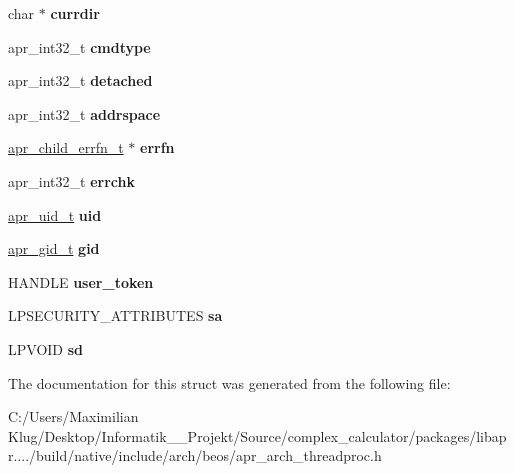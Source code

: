 \begin{DoxyCompactItemize}
\item 
\mbox{\label{structapr__procattr__t_af18bc3b976481e21b7f28aa80b51d5c6}} 
char $\ast$ {\bfseries currdir}
\item 
\mbox{\label{structapr__procattr__t_a5eccc57bc4f7b431e908fe5d122a747a}} 
apr\+\_\+int32\+\_\+t {\bfseries cmdtype}
\item 
\mbox{\label{structapr__procattr__t_a0d6c34b77e0530d9fe46d3af7c8e8fc9}} 
apr\+\_\+int32\+\_\+t {\bfseries detached}
\item 
\mbox{\label{structapr__procattr__t_a7ed0386d21108c46e0c99a72cfed17ce}} 
apr\+\_\+int32\+\_\+t {\bfseries addrspace}
\item 
\mbox{\label{structapr__procattr__t_a493816f4a4eac5b7d2453c1b99176706}} 
\mbox{\hyperlink{group__apr__thread__proc_ga1feae4cf7ed6f156a0db10172e228e2d}{apr\+\_\+child\+\_\+errfn\+\_\+t}} $\ast$ {\bfseries errfn}
\item 
\mbox{\label{structapr__procattr__t_a16163057dbd92ddf9f91bf7fc8999c18}} 
apr\+\_\+int32\+\_\+t {\bfseries errchk}
\item 
\mbox{\label{structapr__procattr__t_aab58995d64f21273fd92b102a38ca05f}} 
\mbox{\hyperlink{group__apr__user_gad1aa508f584bc230acf4f68ba4fc4de7}{apr\+\_\+uid\+\_\+t}} {\bfseries uid}
\item 
\mbox{\label{structapr__procattr__t_a6c1fc0bb1a36b76b819f6134da011790}} 
\mbox{\hyperlink{group__apr__user_ga22e9e224e984f837f3e276833e2f3a55}{apr\+\_\+gid\+\_\+t}} {\bfseries gid}
\item 
\mbox{\label{structapr__procattr__t_a5c318dfdfa4357ca018ff85293296240}} 
H\+A\+N\+D\+LE {\bfseries user\+\_\+token}
\item 
\mbox{\label{structapr__procattr__t_a88d162b7f107f67a7eb65b5d6a743186}} 
L\+P\+S\+E\+C\+U\+R\+I\+T\+Y\+\_\+\+A\+T\+T\+R\+I\+B\+U\+T\+ES {\bfseries sa}
\item 
\mbox{\label{structapr__procattr__t_a6360d8d5d8b3ab841ccfbab8e3172960}} 
L\+P\+V\+O\+ID {\bfseries sd}
\end{DoxyCompactItemize}


The documentation for this struct was generated from the following file\+:\begin{DoxyCompactItemize}
\item 
C\+:/\+Users/\+Maximilian Klug/\+Desktop/\+Informatik\+\_\+\_\+\+Projekt/\+Source/complex\+\_\+calculator/packages/libapr..../build/native/include/arch/beos/apr\+\_\+arch\+\_\+threadproc.\+h\end{DoxyCompactItemize}
